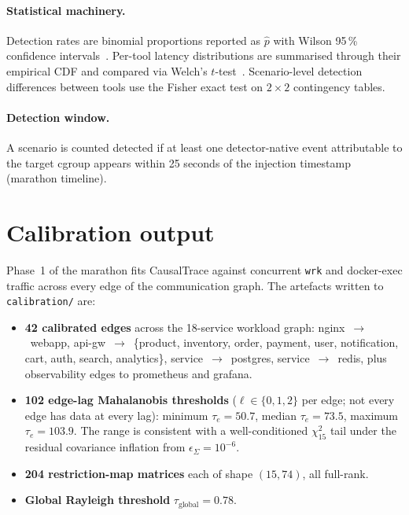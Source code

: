 \paragraph{Statistical machinery.} Detection rates are binomial
proportions reported as $\hat{p}$ with Wilson 95\,\% confidence
intervals~\cite{wilson1927}. Per-tool latency distributions are
summarised through their empirical CDF and compared via Welch's
$t$-test~\cite{welch1947}. Scenario-level detection differences between
tools use the Fisher exact test on $2 \times 2$ contingency tables.

\paragraph{Detection window.} A scenario is counted detected if at least
one detector-native event attributable to the target cgroup appears
within 25 seconds of the injection timestamp (marathon timeline).

\section{Calibration output}
\label{sec:cal-output}

Phase~1 of the marathon fits CausalTrace against concurrent \texttt{wrk}
and docker-exec traffic across every edge of the communication graph. The
artefacts written to \texttt{calibration/} are:

\begin{itemize}
  \item \textbf{42 calibrated edges} across the 18-service workload
        graph: nginx~$\to$~webapp, api-gw~$\to$~\{product, inventory,
        order, payment, user, notification, cart, auth, search,
        analytics\}, service~$\to$~postgres, service~$\to$~redis, plus
        observability edges to prometheus and grafana.
  \item \textbf{102 edge-lag Mahalanobis thresholds}
        ($\ell \in \{0, 1, 2\}$ per edge; not every edge has data at
        every lag): minimum $\tau_e = 50.7$, median $\tau_e = 73.5$,
        maximum $\tau_e = 103.9$. The range is consistent with a
        well-conditioned $\chi^2_{15}$ tail under the residual
        covariance inflation from $\epsilon_\Sigma = 10^{-6}$.
  \item \textbf{204 restriction-map matrices} each of shape
        $(15, 74)$, all full-rank.
  \item \textbf{Global Rayleigh threshold}
        $\tau_{\text{global}} = 0.78$.
\end{itemize}

